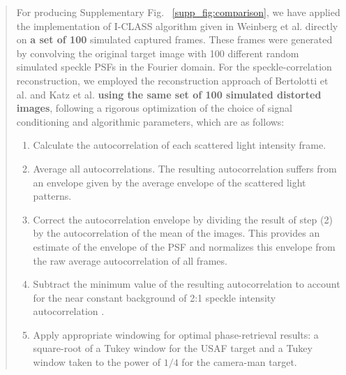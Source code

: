 \documentclass[12pt]{article}
\newenvironment{finished_ourresponse}
    {\begin{tcolorbox}[width=\linewidth,breakable,enhanced,colback=gray!5,colframe=finished_responsecolor!50,title=Response,left=5pt,right=5pt]}
    {\end{tcolorbox}}
\begin{document}
\begin{finished_ourresponse}
\begin{quote}
{        For producing Supplementary Fig. ~\ref{supp_fig:comparison}, we have applied the implementation of I-CLASS algorithm given in Weinberg et al.\cite{weinberg2024noninvasive} directly on \textbf{a set of 100} simulated captured frames. These frames were generated by convolving the original target image with 100 different random simulated speckle PSFs in the Fourier domain.
        For the speckle-correlation reconstruction, we employed the reconstruction approach of Bertolotti et al. and Katz et al. \cite{bert12, katz14} \textbf{using the same set of 100 simulated distorted images}, following a rigorous optimization of the choice of signal conditioning and algorithmic parameters, which are as follows:

        \begin{enumerate}
            \item Calculate the autocorrelation of each scattered light intensity frame.
            \item Average all autocorrelations. The resulting autocorrelation suffers from an envelope given by the average envelope of the scattered light patterns.
            \item Correct the autocorrelation envelope by dividing the result of step (2) by the autocorrelation of the mean of the images. This provides an estimate of the envelope of the PSF and normalizes this envelope from the raw average autocorrelation of all frames.
            \item Subtract the minimum value of the resulting autocorrelation to account for the near constant background of 2:1 speckle intensity autocorrelation \cite{katz14}.
            \item Apply appropriate windowing for optimal phase-retrieval results: a square-root of a Tukey window for the USAF target and a Tukey window taken to the power of $1/4$  for the camera-man target.
        \end{enumerate}
        
}
\end{quote}
\end{finished_ourresponse}
\end{document}
